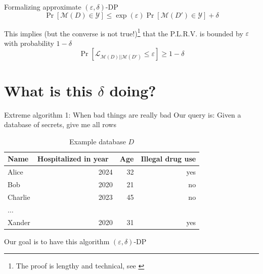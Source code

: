 \documentclass[12pt,aspectratio=169,handout]{beamer}
\begin{document}
\begin{frame}{Formalizing approximate $(\varepsilon, \delta)$-DP}
$$
\Pr[\mathcal{M}(D) \in \mathcal{Y}] \leq \exp(\varepsilon) \Pr[\mathcal{M}(D') \in \mathcal{Y}] + \delta
$$

This implies (but the converse is not true!)\footnote{The proof is lengthy and technical, see \citet[pp.~44--47]{Dwork.Roth.2013}} that the P.L.R.V. is bounded by $\varepsilon$ with probability $1 - \delta$
$$
\Pr\left[\mathcal{L}_{\mathcal{M}(D) || \mathcal{M}(D')} \leq \varepsilon \right]
\geq 1 - \delta
$$


\end{frame}


\section{What is this $\delta$ doing?}


\begin{frame}{Extreme algorithm 1: When bad things are really bad}
Our query is: Given a database of secrets, give me all rows

\begin{table}
\footnotesize
\begin{tabular}{lrrr} \toprule
Name & Hospitalized in year & Age & Illegal drug use \\ \midrule
Alice & 2024 & 32 & yes \\
Bob & 2020 & 21 & no \\
Charlie & 2023 & 45 & no \\
$\ldots$ & & & \\
Xander & 2020 & 31 & yes \\ \bottomrule
\end{tabular}
\caption{Example database $D$}
\end{table}

Our goal is to have this algorithm $(\varepsilon, \delta)$-DP

\end{frame}
\end{document}
